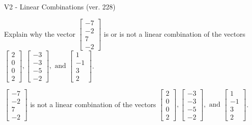 \begin{exercise}
  \begin{exerciseTitle}V2 - Linear Combinations (ver. 228)\end{exerciseTitle}
  \begin{exerciseStatement}
    Explain why the vector \(\left[\begin{array}{c}
-7 \\
-2 \\
7 \\
-2
\end{array}\right]\)  is or is not a linear 
	combination of the vectors \(\left[\begin{array}{c}
2 \\
0 \\
0 \\
2
\end{array}\right] , \left[\begin{array}{c}
-3 \\
-3 \\
-5 \\
-2
\end{array}\right] , \text{ and } \left[\begin{array}{c}
1 \\
-1 \\
3 \\
2
\end{array}\right]\).
	


  \end{exerciseStatement}
  \begin{exerciseAnswer}
   \(\left[\begin{array}{c}
-7 \\
-2 \\
7 \\
-2
\end{array}\right]\) 
  	 is not  
	a linear combination of the vectors \(\left[\begin{array}{c}
2 \\
0 \\
0 \\
2
\end{array}\right] , \left[\begin{array}{c}
-3 \\
-3 \\
-5 \\
-2
\end{array}\right] , \text{ and } \left[\begin{array}{c}
1 \\
-1 \\
3 \\
2
\end{array}\right]\).

	
  


  \end{exerciseAnswer}
\end{exercise}
